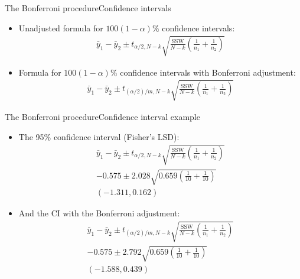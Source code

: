 \documentclass[xcolor=dvipsnames]{beamer}
\begin{document}
\begin{frame}{The Bonferroni procedure}{Confidence intervals}
	\begin{itemize}
		\item Unadjusted formula for $100(1-\alpha)\%$ confidence intervals: \pause
		\begin{gather*}
		\bar{y}_1 - \bar{y}_2 \pm t_{\alpha / 2, N - k}{\sqrt{\frac{\text{SSW}}{N-k} \left(\frac{1}{n_1}+\frac{1}{n_2}\right)}}
		\end{gather*} \pause
		\item Formula for $100(1-\alpha)\%$ confidence intervals with Bonferroni adjustment: \pause
		\begin{gather*}
		\bar{y}_1 - \bar{y}_2 \pm t_{(\alpha / 2) / m, N - k}{\sqrt{\frac{\text{SSW}}{N-k} \left(\frac{1}{n_1}+\frac{1}{n_2}\right)}}
		\end{gather*}
	\end{itemize}
\end{frame}

\begin{frame}{The Bonferroni procedure}{Confidence interval example}
	\begin{itemize}
		\item The 95\% confidence interval (Fisher's LSD): \pause
			\begin{gather*}
			\bar{y}_1 - \bar{y}_2 \pm t_{\alpha / 2, N - k}{\sqrt{\frac{\text{SSW}}{N-k} \left(\frac{1}{n_1}+\frac{1}{n_2}\right)}} \\
			-0.575 \pm 2.028\sqrt{0.659 \left(\frac{1}{10}+\frac{1}{10}\right)} \\
			(-1.311,  0.162)
			\end{gather*}\pause
		\item And the CI with the Bonferroni adjustment: \pause
		\begin{gather*}
		\bar{y}_1 - \bar{y}_2 \pm t_{(\alpha / 2) / m, N - k}{\sqrt{\frac{\text{SSW}}{N-k} \left(\frac{1}{n_1}+\frac{1}{n_2}\right)}} \\
		-0.575 \pm 2.792 \sqrt{0.659 \left(\frac{1}{10}+\frac{1}{10}\right)} \\
		(-1.588, 0.439)
		\end{gather*}
	\end{itemize}
\end{frame}
\end{document}

